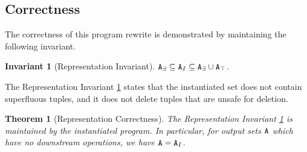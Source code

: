 \documentclass[10pt]{proc}
\newtheorem{thm}[theorem]{Theorem}
\newtheorem{invariant}[property]{Invariant}
\renewcommand{\tt}[1]{\ifmmode\text{\texttt{#1}}\else\texttt{#1}\fi}
\begin{document}
\subsection{Correctness}
The correctness of this program rewrite is demonstrated by maintaining the following invariant.
\begin{invariant}[Representation Invariant]\label{inv:representation}
$\tt{A}_\exists \subseteq \tt{A}_I \subseteq \tt{A}_\exists \cup \tt{A}_\top$.
\end{invariant}
The Representation Invariant \ref{inv:representation} states that the instantiated set does not contain superfluous tuples, and it does not delete tuples that are unsafe for deletion.

\begin{thm}[Representation Correctness]
The Representation Invariant \ref{inv:representation} is maintained by the instantiated program.
In particular, for output sets $\tt{A}$ which have no downstream operations, we have $\tt{A} = \tt{A}_I$.
\end{thm}
\end{document}

